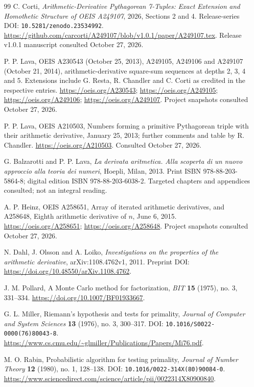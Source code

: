 \documentclass[11pt]{article}
\theoremstyle{definition}
\theoremstyle{remark}
\begin{document}
\begin{thebibliography}{99}
C. Corti, \emph{Arithmetic-Derivative Pythagorean 7-Tuples: Exact
Extension and Homothetic Structure of OEIS A249107}, 2026,
Sections 2 and 4.
Release-series DOI: \texttt{10.5281/zenodo.23534992}.
\url{https://github.com/carcorti/A249107/blob/v1.0.1/paper/A249107.tex}.
Release v1.0.1 manuscript consulted October 27, 2026.

P. P. Lava, OEIS A230543 (October 25, 2013), A249105, A249106 and
A249107 (October 21, 2014), arithmetic-derivative square-sum
sequences at depths 2, 3, 4 and 5. Extensions include G. Resta,
R. Chandler and C. Corti as credited in the respective entries.
\url{https://oeis.org/A230543}; \url{https://oeis.org/A249105};
\url{https://oeis.org/A249106}; \url{https://oeis.org/A249107}.
Project snapshots consulted October 27, 2026.

P. P. Lava, OEIS A210503, Numbers forming a primitive Pythagorean
triple with their arithmetic derivative, January 25, 2013;
further comments and table by R. Chandler.
\url{https://oeis.org/A210503}. Consulted October 27, 2026.

G. Balzarotti and P. P. Lava, \emph{La derivata aritmetica.
Alla scoperta di un nuovo approccio alla teoria dei numeri},
Hoepli, Milan, 2013. Print ISBN 978-88-203-5864-8;
digital edition ISBN 978-88-203-6038-2.
Targeted chapters and appendices consulted; not an integral reading.

A. P. Heinz, OEIS A258651, Array of iterated arithmetic derivatives,
and A258648, Eighth arithmetic derivative of $n$, June 6, 2015.
\url{https://oeis.org/A258651}; \url{https://oeis.org/A258648}.
Project snapshots consulted October 27, 2026.

N. Dahl, J. Olsson and A. Loiko, \emph{Investigations on the
properties of the arithmetic derivative}, arXiv:1108.4762v1, 2011.
Preprint DOI: \url{https://doi.org/10.48550/arXiv.1108.4762}.

J. M. Pollard, A Monte Carlo method for factorization,
\emph{BIT} \textbf{15} (1975), no. 3, 331--334.
\url{https://doi.org/10.1007/BF01933667}.

G. L. Miller, Riemann's hypothesis and tests for primality,
\emph{Journal of Computer and System Sciences} \textbf{13} (1976),
no. 3, 300--317. DOI: \texttt{10.1016/S0022-0000(76)80043-8}.
\url{https://www.cs.cmu.edu/~glmiller/Publications/Papers/Mi76.pdf}.

M. O. Rabin, Probabilistic algorithm for testing primality,
\emph{Journal of Number Theory} \textbf{12} (1980), no. 1, 128--138.
DOI: \texttt{10.1016/0022-314X(80)90084-0}.
\url{https://www.sciencedirect.com/science/article/pii/0022314X80900840}.


\end{thebibliography}
\end{document}
